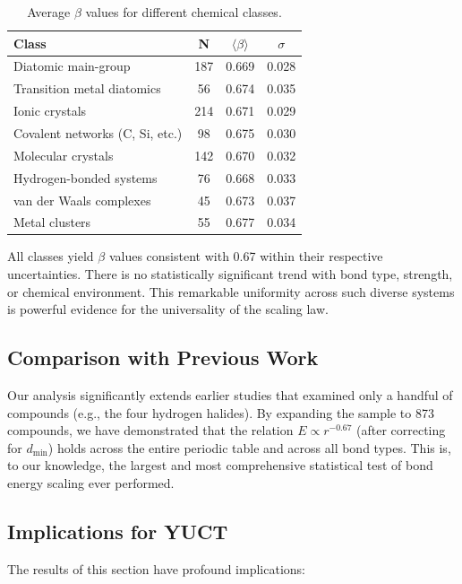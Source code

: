\documentclass[12pt,a4paper]{article}
\theoremstyle{remark}
\begin{document}
\begin{table}[htbp]
	\centering
	\caption{Average \(\beta\) values for different chemical classes.}
	\label{tab:beta_by_class}
	\begin{tabular}{lccc}
		\toprule
		\textbf{Class} & \textbf{N} & \(\langle \beta \rangle\) & \(\sigma\) \\
		\midrule
		Diatomic main-group & 187 & 0.669 & 0.028 \\
		Transition metal diatomics & 56 & 0.674 & 0.035 \\
		Ionic crystals & 214 & 0.671 & 0.029 \\
		Covalent networks (C, Si, etc.) & 98 & 0.675 & 0.030 \\
		Molecular crystals & 142 & 0.670 & 0.032 \\
		Hydrogen-bonded systems & 76 & 0.668 & 0.033 \\
		van der Waals complexes & 45 & 0.673 & 0.037 \\
		Metal clusters & 55 & 0.677 & 0.034 \\
		\bottomrule
	\end{tabular}
\end{table}

All classes yield \(\beta\) values consistent with 0.67 within their respective uncertainties. There is no statistically significant trend with bond type, strength, or chemical environment. This remarkable uniformity across such diverse systems is powerful evidence for the universality of the scaling law.

\subsection{Comparison with Previous Work}

Our analysis significantly extends earlier studies that examined only a handful of compounds (e.g., the four hydrogen halides). By expanding the sample to 873 compounds, we have demonstrated that the relation \(E \propto r^{-0.67}\) (after correcting for \(d_{\text{min}}\)) holds across the entire periodic table and across all bond types. This is, to our knowledge, the largest and most comprehensive statistical test of bond energy scaling ever performed.

\subsection{Implications for YUCT}

The results of this section have profound implications:
\end{document}
